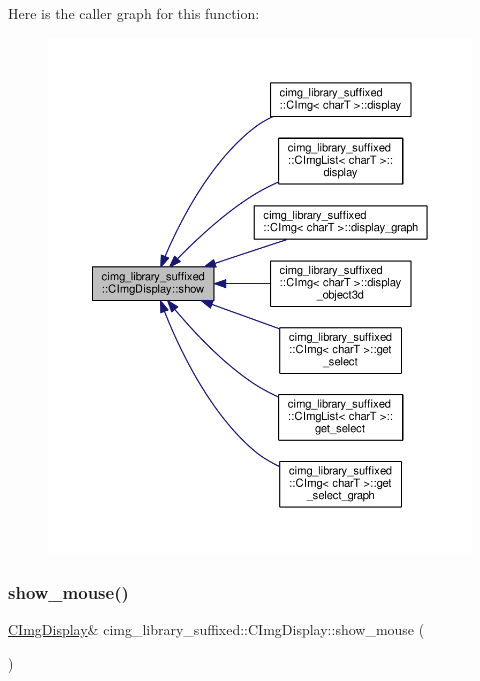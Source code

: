 Here is the caller graph for this function\+:
\nopagebreak
\begin{figure}[H]
\begin{center}
\leavevmode
\includegraphics[width=350pt]{d5/d53/structcimg__library__suffixed_1_1CImgDisplay_a40569e73fec12daeec84942b0d0f1b6d_icgraph}
\end{center}
\end{figure}
\mbox{\label{structcimg__library__suffixed_1_1CImgDisplay_ac1d14f9181bff9e87ff95deb4ec752a5}} 
\subsubsection{\texorpdfstring{show\+\_\+mouse()}{show\_mouse()}}
{\footnotesize\ttfamily \hyperlink{structcimg__library__suffixed_1_1CImgDisplay}{C\+Img\+Display}\& cimg\+\_\+library\+\_\+suffixed\+::\+C\+Img\+Display\+::show\+\_\+mouse (\begin{DoxyParamCaption}{ }\end{DoxyParamCaption})\hspace{0.3cm}{\ttfamily [inline]}}



